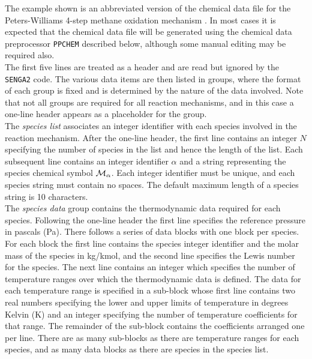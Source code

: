\documentclass[dvips]{article}
\begin{document}
The example shown is an abbreviated version of the chemical data file for the
Peters-Williams 4-step methane oxidation mechanism \cite{PW87}.  In most cases
it is expected that the chemical data file
will be generated using the chemical data preprocessor {\tt PPCHEM} described
below, although some manual editing may be required also.\\

\noindent
The first five lines are treated as a header and are read but ignored by
the {\tt SENGA2} code.  The various data items are then listed in groups,
where the format of each group is fixed and is determined by the nature of
the data involved.  Note that not all groups are required for all reaction
mechanisms, and in this case a one-line header appears as a placeholder for
the group.\\

\noindent
The {\it species list} associates an integer identifier with each species
involved in the reaction mechanism.  After the one-line header, the
first line contains an integer $N$ specifying the number of species in the
list and hence the length of the list.  Each subsequent line contains an
integer identifier $\alpha$ and a
string representing the species chemical symbol ${\cal M}_{\alpha}$.
Each integer identifier must be unique, and each species string must contain
no spaces.  The default maximum length of a species string is 10 characters.\\

\noindent
The {\it species data} group contains the thermodynamic data required
for each species.
Following the one-line header the first line specifies the reference pressure
in pascals (Pa).  There follows a series of data blocks with one block per
species.  For each block the first line contains the species integer
identifier and the molar mass of the species in kg/kmol, and the second line
specifies the Lewis number for the species.  The next line contains an
integer which specifies the number of temperature ranges over which the
thermodynamic data is defined.  The data for each temperature range is
specified in a sub-block whose first line contains two real numbers
specifying the lower and upper limits of temperature in degrees Kelvin
(K) and an integer specifying the number of temperature coefficients for that
range.  The remainder of the sub-block contains the coefficients
arranged one per line.  There are as many sub-blocks as there are
temperature ranges for each species, and as many data blocks as there
are species in the species list.\\
\end{document}
